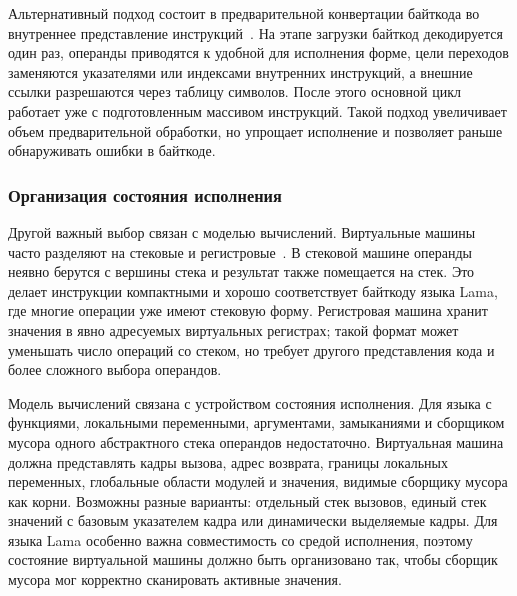 Альтернативный подход состоит в предварительной конвертации байткода во внутреннее представление
инструкций~\cite{dram2024threaded, ThreadedCode}. На этапе загрузки
байткод декодируется один раз, операнды приводятся к удобной для исполнения
форме, цели переходов заменяются указателями или индексами внутренних
инструкций, а внешние ссылки разрешаются через таблицу символов. После этого
основной цикл работает уже с подготовленным массивом инструкций. Такой подход
увеличивает объем предварительной обработки, но упрощает исполнение и
позволяет раньше обнаруживать ошибки в байткоде.

\subsubsection{Организация состояния исполнения}
Другой важный выбор связан с моделью вычислений. Виртуальные машины часто
разделяют на стековые и регистровые~\cite{Shi, Simek}. В стековой машине
операнды неявно берутся с вершины стека и результат также помещается на стек.
Это делает инструкции компактными и хорошо соответствует байткоду языка Lama, где
многие операции уже имеют стековую форму. Регистровая машина хранит значения в
явно адресуемых виртуальных регистрах; такой формат может уменьшать число
операций со стеком, но требует другого представления кода и более сложного
выбора операндов.

Модель вычислений связана с устройством состояния исполнения. Для языка с
функциями, локальными переменными, аргументами, замыканиями и сборщиком мусора
одного абстрактного стека операндов недостаточно. Виртуальная машина должна
представлять кадры вызова, адрес возврата, границы локальных переменных,
глобальные области модулей и значения, видимые сборщику мусора как корни.
Возможны разные варианты: отдельный стек вызовов, единый стек значений с
базовым указателем кадра или динамически выделяемые кадры. Для языка Lama особенно
важна совместимость со средой исполнения, поэтому состояние виртуальной машины
должно быть организовано так, чтобы сборщик мусора мог корректно сканировать
активные значения.

